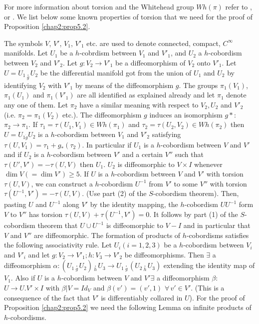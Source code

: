 For more information about torsion and the Whitehead group $Wh(\pi)$
refer to \cite{c2:key1}, \cite{c2:key5} or \cite{c2:key13}. We list below some
known properties of torsion that we need for the proof of Proposition
\ref{chap2:prop5.2}.  
 
 The symbols $V$, $V'$, $V_1$, $V'_1$ etc. are used to denote
 connected, compact, $C^\infty$ manifolds. Let $U_1$ be a $h$-cobrdism
 between $V_1$ and $V'_1$, and $U_2$ a $h$-cobordism between $V_2$ and
 $V'_2$. Let $g: V_2 \to V'_1$ be a diffeomorphism of $V_2$ onto
 $V'_1$. Let $U=U_1 \, \underset{g}{.} \, U_{2}$ be the differential manifold
 got from the union of $U_1$ and $U_2$ by identifying $V_2$ with
 $V'_1$ by means of the diffeomorphism $g$. The groups $\pi_1 (V_1)$,
 $\pi_1 (U_1)$ and $\pi_1 (V'_1)$ are all identified as explained
 already and let $\pi_1$ denote any one of them. Let $\pi_2$ have a
 similar meaning with respect to $V_2, U_2$ and $V'_2$ (i.e. $\pi_2=
 \pi_1(V_2)$ etc.). The diffeomorphism $g$ induces an isomorphism $g*$:
 $\pi_2 \to \pi_1$. If $\tau_1 = \tau(U_1, V_1) \in Wh
 (\pi_1)$ and $\tau_2 = \tau (U_2, V_2) \in Wh (\pi_2)$ then
 $U=U_{1\dot{g}} U_2$ is a $h$-cobordism between $V_1$ and $V'_2$
 satisfying $\tau(U, V_1)= \tau_1 + g_* (\tau_2)$. In particular if
 $U_1$ is a $h$-cobordism between $V$ and $V'$ and if $U_2$ is a
 $h$-cobordism between $V'$ and a certain $V''$ such that $\tau (U',
 V') = - \tau (U, V)$ then $U_1$. $U_2$ is diffeomorphic\pageoriginale
 to $V \times 
 I$ whenever $\dim V(= \dim V') \geq 5$. If $U$ is a $h$-cobordism
 between $V$ and $V'$ with torsion $\tau (U,V)$, we can construct a
 $h$-cobordism $U^{-1}$ from $V'$ to some $V''$ with torsion $\tau
 (U^{-1}, V')=- \tau (U, V)$. (Use part (2) of the
 $S$-cobordism theorem). Then, pasting $U$ and $U^{-1}$ along $V'$ by
 the identity mapping, the $h$-cobordism $U U^{-1}$ form $V$ to $V''$
 has torsion $\tau (U, V)+ \tau (U^{-1}, V') = 0$. It follows by part
 (1) of the $S$-cobordism theorem that $U \cup U^{-1}$ is
 diffeomorphic to $V-I$ and in particular that $V$ and $V''$ are
 diffeomorphic. The formation of products of $h$-cobordisms satisfies
 the following associativity rule. Let $U_i(i= 1, 2, 3)$ be a
 $h$-cobordism between $V_i$ and $V'_i$ and let $g: V_2 \to V'_1; h:
 V_3 \to V'_2$ be diffeomorphisms. Then $\exists$ a diffeomorphism
$\alpha : (U_1 \underset{g}{\cdot} U_2) \underset{h}{\cdot} U_3 \to U_1
 \underset{g}{\cdot} (U_2 \underset{h}{\cdot} U_3)$
extending the identity map of $V_1$. Also if $U$ is a
 $h$-cobordism between $V$ and $V' \exists$ a diffeomorphism $\beta$:
 $ U \to U. V' \times I$ with $\beta|V= Id_V$ and $\beta (v')= (v', 1)$
 $\forall \, v' \in  V'$. (This is a consequence of the fact that $V'$ is
 differentiably collared in $U$). For the proof of Proposition \ref{chap2:prop5.2} we
 need the following Lemma on infinite products of $h$-cobordisms. 
 
